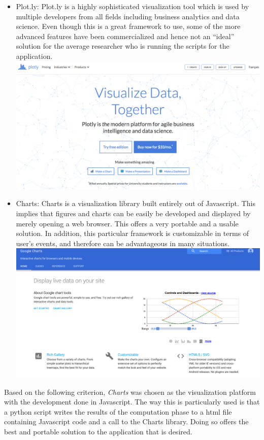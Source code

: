 \begin{itemize}
\begin{itemize}
        \item Plot.ly: Plot.ly is a highly sophisticated visualization tool which is used by multiple developers from all fields including business analytics and data science. Even though this is a great framework to use, some of the more advanced features have been commercialized and hence not an ``ideal'' solution for the average researcher who is running the scripts for the application. \newline
        \includegraphics[scale=0.25]{images/plotly}
        
        \item Charts: Charts is a visualization library built entirely out of Javascript. This implies that figures and charts can be easily be developed and displayed by merely opening a web browser. This offers a very portable and a usable solution. In addition, this particular framework is customizable in terms of user's events, and therefore can be advantageous in many situations.\newline \newline
        \includegraphics[scale=0.27]{images/charts}
    \end{itemize}
    
    Based on the following criterion, \textit{Charts} was chosen as the visualization platform with the development done in Javascript. The way this is particularly used is that a python script writes the results of the computation phase to a html file containing Javascript code and a call to the Charts library. Doing so offers the best and portable solution to the application that is desired.  
        
\end{itemize}

